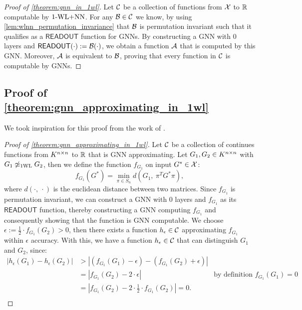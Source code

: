 \begin{proof}[Proof of \cref{theorem:gnn_in_1wl}]
    Let $\mathcal{C}$ be a collection of functions from $\mathcal{X}$ to $\mathbb{R}$ computable by $\text{1-WL+NN}$. For any $\mathcal{B} \in \mathcal{C}$ we know, by using \cref{lem:wlnn_permutation_invariance} that $\mathcal{B}$ is permutation invariant such that it qualifies as a $\textsf{READOUT}$ function for GNNs. By constructing a GNN with $0$ layers and $\textsf{READOUT}(\cdot) := \mathcal{B}(\cdot)$, we obtain a function $\mathcal{A}$ that is computed by this GNN. Moreover, $\mathcal{A}$ is equivalent to $\mathcal{B}$, proving that every function in $\mathcal{C}$ is computable by GNNs.
\end{proof}

\subsection{Proof of \cref{theorem:gnn_approximating_in_1wl}}
We took inspiration for this proof from the work of \cite{Chen2019}.

\begin{proof}[Proof of \cref{theorem:gnn_approximating_in_1wl}]
    Let $\mathcal{C}$ be a collection of continues functions from $K^{n \times n}$ to $\mathbb{R}$ that is GNN approximating. Let $G_1, G_2 \in K^{n \times n}$ with $G_1 \not\simeq_{\text{1WL}} G_2$, then we define the function $f_{G_1}$ on input $G^* \in \mathcal{X}$:
    \begin{equation*}
         f_{G_1}(G^*) = \min_{\pi \in S_n} d(G_1, \  \pi^T G^* \pi),
    \end{equation*} where $d(\cdot, \ \cdot)$ is the euclidean distance between two matrices. Since $f_{G_1}$ is permutation invariant, we can construct a GNN with $0$ layers and $f_{G_1}$ as its $\textsf{READOUT}$ function, thereby constructing a GNN computing $f_{G_1}$ and consequently showing that the function is GNN computable.
    We choose $\epsilon := \frac{1}{2} \cdot f_{G_1}(G_2) > 0$, then there exists a function $h_\epsilon \in \mathcal{C}$ approximating $f_{G_1}$ within $\epsilon$ accuracy. With this, we have a function $h_\epsilon \in \mathcal{C}$ that can distinguish $G_1$ and $G_2$, since:
    \begin{align*}
        | h_\epsilon(G_1) - h_\epsilon(G_2)| &> | (f_{G_1}(G_1) - \epsilon) - (f_{G_1}(G_2) + \epsilon)|\\
        &= |f_{G_1}(G_2) -2 \cdot \epsilon| \quad&\text{by definition $f_{G_1}(G_1) = 0$}\\
        &= |f_{G_1}(G_2) -2 \cdot \frac{1}{2} \cdot f_{G_1}(G_2)| = 0.\\
    \end{align*}
\end{proof}

